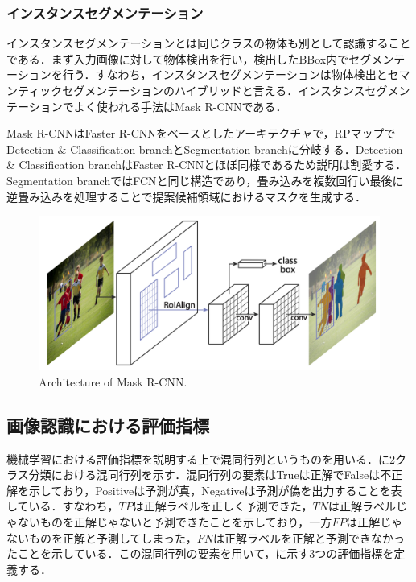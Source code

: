 \subsubsection{インスタンスセグメンテーション}
インスタンスセグメンテーションとは同じクラスの物体も別として認識することである．まず入力画像に対して物体検出を行い，検出したBBox内でセグメンテーションを行う．すなわち，インスタンスセグメンテーションは物体検出とセマンティックセグメンテーションのハイブリッドと言える．インスタンスセグメンテーションでよく使われる手法はMask R-CNNである\cite{MaskRCNN}．

Mask R-CNNはFaster R-CNNをベースとしたアーキテクチャで，RPマップでDetection \& Classification branchとSegmentation branchに分岐する．Detection \& Classification branchはFaster R-CNNとほぼ同様であるため説明は割愛する．Segmentation branchではFCN\cite{FCN}と同じ構造であり，畳み込みを複数回行い最後に逆畳み込みを処理することで提案候補領域におけるマスクを生成する．

\begin{figure}[H]
    \centering
    \includegraphics[width=0.7\linewidth]{figure/chapter2/mrcnn}
    \caption[Architecture of Mask R-CNN.]{Architecture of Mask R-CNN\cite{MaskRCNN}.}
    \label{fig:mrcnn}
\end{figure}



\subsection{画像認識における評価指標}
機械学習における評価指標を説明する上で混同行列というものを用いる．に2クラス分類における混同行列を示す．混同行列の要素はTrueは正解でFalseは不正解を示しており，Positiveは予測が真，Negativeは予測が偽を出力することを表している．すなわち，$TP$は正解ラベルを正しく予測できた，$TN$は正解ラベルじゃないものを正解じゃないと予測できたことを示しており，一方$FP$は正解じゃないものを正解と予測してしまった，$FN$は正解ラベルを正解と予測できなかったことを示している．この混同行列の要素を用いて，に示す3つの評価指標を定義する．


